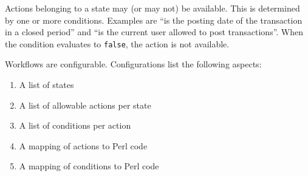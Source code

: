 
Actions belonging to a state may (or may not) be available. This is determined by one or
more conditions.  Examples are ``is the posting date of the transaction in a closed period''
and ``is the current user allowed to post transactions''.  When the condition evaluates to
\texttt{false}, the action is not available.

Workflows are configurable. Configurations list the following aspects:

\begin{enumerate}
	\item A list of states
	\item A list of allowable actions per state
	\item A list of conditions per action
	\item A mapping of actions to Perl code
	\item A mapping of conditions to Perl code
\end{enumerate}

